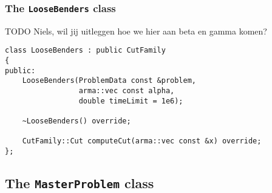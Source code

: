 \documentclass[12pt, english]{article}
\begin{document}
\subsubsection{The \texttt{LooseBenders} class}
\label{subsubsec:loose_benders}

TODO Niels, wil jij uitleggen hoe we hier aan beta en gamma komen?

\begin{lstlisting}[caption={Public interface of the \texttt{LooseBenders} class.}, 
                   label={listing:loose_benders}]
class LooseBenders : public CutFamily
{
public:
	LooseBenders(ProblemData const &problem,
			 	 arma::vec const alpha,
			 	 double timeLimit = 1e6);
	
	~LooseBenders() override;
	
	CutFamily::Cut computeCut(arma::vec const &x) override;
};
\end{lstlisting}

\subsection{The \texttt{MasterProblem} class}
\label{subsec:master_problem_class}
\end{document}
